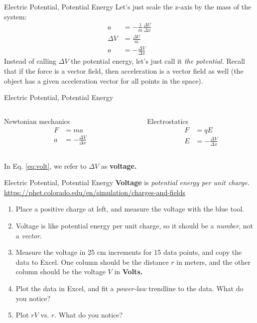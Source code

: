 \documentclass{beamer}
\begin{document}
\begin{frame}{Electric Potential, Potential Energy}
\small
Let's just scale the z-axis by the mass of the system:
\begin{align}
a &= -\frac{1}{m}\frac{\Delta U}{\Delta x} \\
\Delta V &= \frac{\Delta U}{m} \\
a &= -\frac{\Delta V}{\Delta x}
\end{align}
Instead of calling $\Delta V$ the potential energy, let's just call it \textit{the potential.}  Recall that if the force is a vector field, then acceleration is a vector field as well (the object has a given acceleration vector for all points in the space).
\end{frame}

\begin{frame}{Electric Potential, Potential Energy}
\begin{columns}[T]
\begin{column}{0.5\textwidth}
\alert{Newtonian mechanics} \\ \hrulefill
\begin{align}
F &= ma \\
a &= -\frac{\Delta V}{\Delta x}
\end{align}
\end{column}
\begin{column}{0.5\textwidth}
\alert{Electrostatics} \\ \hrulefill
\begin{align}
F &= qE \\
E &= -\frac{\Delta V}{\Delta x} \label{eq:volt}
\end{align}
\end{column}
\end{columns} \vspace{1cm}
In Eq. \ref{eq:volt}, we refer to $\Delta V$ as \textbf{voltage.}
\end{frame}

\begin{frame}{Electric Potential, Potential Energy}
\small
\textbf{Voltage} is \textit{potential energy per unit charge.} \\ \vspace{0.5cm}
\url{https://phet.colorado.edu/en/simulation/charges-and-fields} \\
\begin{enumerate}
\item Place a positive charge at left, and measure the voltage with the blue tool.
\item Voltage is like potential energy per unit charge, so it should be a \textit{number}, not a \textit{vector.}
\item Measure the voltage in 25 cm increments for 15 data points, and copy the data to Excel.  One column should be the distance $r$ in meters, and the other column should be the voltage $V$ in \textbf{Volts.}
\item Plot the data in Excel, and fit a \textit{power-law} trendline to the data.  What do you notice?
\item Plot $rV$ vs. $r$.  What do you notice?
\end{enumerate}
\end{frame}
\end{document}
